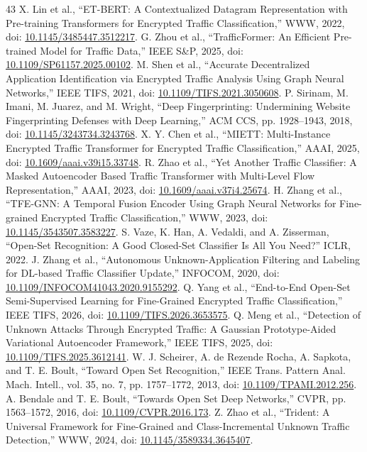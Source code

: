 \documentclass[journal]{IEEEtran}
\begin{document}
\begin{thebibliography}{43}
 X. Lin et al., ``ET-BERT: A Contextualized Datagram Representation with Pre-training Transformers for Encrypted Traffic Classification,'' WWW, 2022, doi: \url{10.1145/3485447.3512217}.
 G. Zhou et al., ``TrafficFormer: An Efficient Pre-trained Model for Traffic Data,'' IEEE S\&P, 2025, doi: \url{10.1109/SP61157.2025.00102}.
 M. Shen et al., ``Accurate Decentralized Application Identification via Encrypted Traffic Analysis Using Graph Neural Networks,'' IEEE TIFS, 2021, doi: \url{10.1109/TIFS.2021.3050608}.
 P. Sirinam, M. Imani, M. Juarez, and M. Wright, ``Deep Fingerprinting: Undermining Website Fingerprinting Defenses with Deep Learning,'' ACM CCS, pp. 1928--1943, 2018, doi: \url{10.1145/3243734.3243768}.
 X. Y. Chen et al., ``MIETT: Multi-Instance Encrypted Traffic Transformer for Encrypted Traffic Classification,'' AAAI, 2025, doi: \url{10.1609/aaai.v39i15.33748}.
 R. Zhao et al., ``Yet Another Traffic Classifier: A Masked Autoencoder Based Traffic Transformer with Multi-Level Flow Representation,'' AAAI, 2023, doi: \url{10.1609/aaai.v37i4.25674}.
 H. Zhang et al., ``TFE-GNN: A Temporal Fusion Encoder Using Graph Neural Networks for Fine-grained Encrypted Traffic Classification,'' WWW, 2023, doi: \url{10.1145/3543507.3583227}.
 S. Vaze, K. Han, A. Vedaldi, and A. Zisserman, ``Open-Set Recognition: A Good Closed-Set Classifier Is All You Need?'' ICLR, 2022.
 J. Zhang et al., ``Autonomous Unknown-Application Filtering and Labeling for DL-based Traffic Classifier Update,'' INFOCOM, 2020, doi: \url{10.1109/INFOCOM41043.2020.9155292}.
 Q. Yang et al., ``End-to-End Open-Set Semi-Supervised Learning for Fine-Grained Encrypted Traffic Classification,'' IEEE TIFS, 2026, doi: \url{10.1109/TIFS.2026.3653575}.
 Q. Meng et al., ``Detection of Unknown Attacks Through Encrypted Traffic: A Gaussian Prototype-Aided Variational Autoencoder Framework,'' IEEE TIFS, 2025, doi: \url{10.1109/TIFS.2025.3612141}.
 W. J. Scheirer, A. de Rezende Rocha, A. Sapkota, and T. E. Boult, ``Toward Open Set Recognition,'' IEEE Trans. Pattern Anal. Mach. Intell., vol. 35, no. 7, pp. 1757--1772, 2013, doi: \url{10.1109/TPAMI.2012.256}.
 A. Bendale and T. E. Boult, ``Towards Open Set Deep Networks,'' CVPR, pp. 1563--1572, 2016, doi: \url{10.1109/CVPR.2016.173}.
 Z. Zhao et al., ``Trident: A Universal Framework for Fine-Grained and Class-Incremental Unknown Traffic Detection,'' WWW, 2024, doi: \url{10.1145/3589334.3645407}.

\end{thebibliography}
\end{document}
